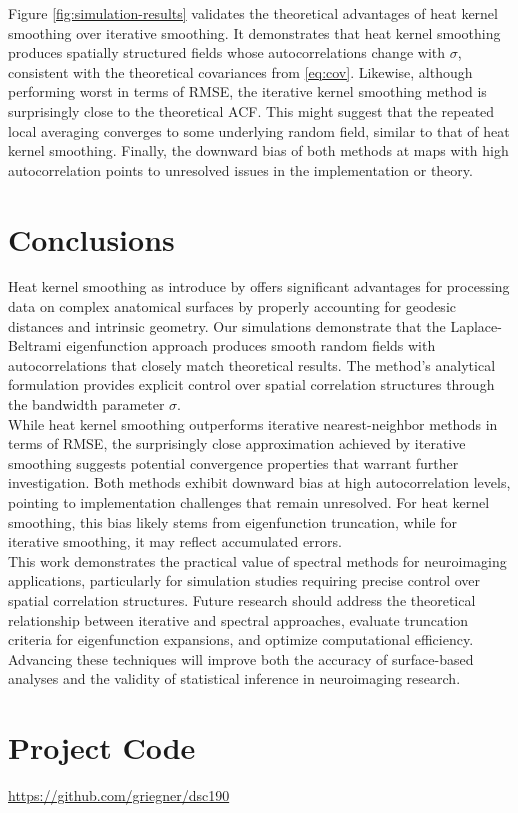 \documentclass{article}
\begin{document}
Figure \ref{fig:simulation-results} validates the theoretical advantages of heat kernel smoothing over iterative smoothing. It demonstrates that heat kernel smoothing produces spatially structured fields whose autocorrelations change with $\sigma$, consistent with the theoretical covariances from \eqref{eq:cov}. Likewise, although performing worst in terms of RMSE, the iterative kernel smoothing method is surprisingly close to the theoretical ACF. This might suggest that the repeated local averaging converges to some underlying random field, similar to that of heat kernel smoothing. Finally, the downward bias of both methods at maps with high autocorrelation points to unresolved issues in the implementation or theory. 

\newpage
\section{Conclusions}

Heat kernel smoothing as introduce by \citet{seo_heat_2010} offers significant advantages for processing data on complex anatomical surfaces by properly accounting for geodesic distances and intrinsic geometry. Our simulations demonstrate that the Laplace-Beltrami eigenfunction approach produces smooth random fields with autocorrelations that closely match theoretical results. The method's analytical formulation provides explicit control over spatial correlation structures through the bandwidth parameter $\sigma$.\\

While heat kernel smoothing outperforms iterative nearest-neighbor methods in terms of RMSE, the surprisingly close approximation achieved by iterative smoothing suggests potential convergence properties that warrant further investigation. Both methods exhibit downward bias at high autocorrelation levels, pointing to implementation challenges that remain unresolved. For heat kernel smoothing, this bias likely stems from eigenfunction truncation, while for iterative smoothing, it may reflect accumulated errors.\\

This work demonstrates the practical value of spectral methods for neuroimaging applications, particularly for simulation studies requiring precise control over spatial correlation structures. Future research should address the theoretical relationship between iterative and spectral approaches, evaluate truncation criteria for eigenfunction expansions, and optimize computational efficiency. Advancing these techniques will improve both the accuracy of surface-based analyses and the validity of statistical inference in neuroimaging research.

\section{Project Code}
\href{https://github.com/griegner/dsc190}{https://github.com/griegner/dsc190}


\end{document}
